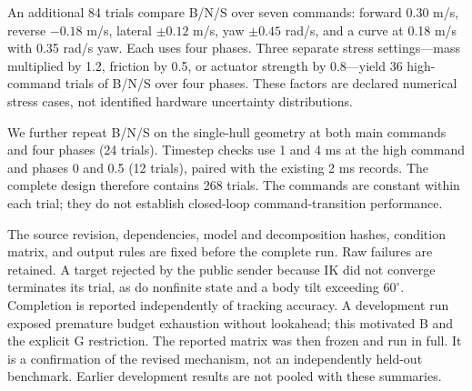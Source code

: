\documentclass[letterpaper,10pt,conference]{ieeeconf}
\begin{document}
An additional 84 trials compare B/N/S over seven commands: forward 0.30 m/s, reverse $-0.18$ m/s, lateral $\pm0.12$ m/s, yaw $\pm0.45$ rad/s, and a curve at 0.18 m/s with 0.35 rad/s yaw. Each uses four phases. Three separate stress settings---mass multiplied by 1.2, friction by 0.5, or actuator strength by 0.8---yield 36 high-command trials of B/N/S over four phases. These factors are declared numerical stress cases, not identified hardware uncertainty distributions.

We further repeat B/N/S on the single-hull geometry at both main commands and four phases (24 trials). Timestep checks use 1 and 4 ms at the high command and phases 0 and 0.5 (12 trials), paired with the existing 2 ms records. The complete design therefore contains 268 trials. The commands are constant within each trial; they do not establish closed-loop command-transition performance.

The source revision, dependencies, model and decomposition hashes, condition matrix, and output rules are fixed before the complete run. Raw failures are retained. A target rejected by the public sender because IK did not converge terminates its trial, as do nonfinite state and a body tilt exceeding $60^\circ$. Completion is reported independently of tracking accuracy. A development run exposed premature budget exhaustion without lookahead; this motivated B and the explicit G restriction. The reported matrix was then frozen and run in full. It is a confirmation of the revised mechanism, not an independently held-out benchmark. Earlier development results are not pooled with these summaries.
\end{document}
